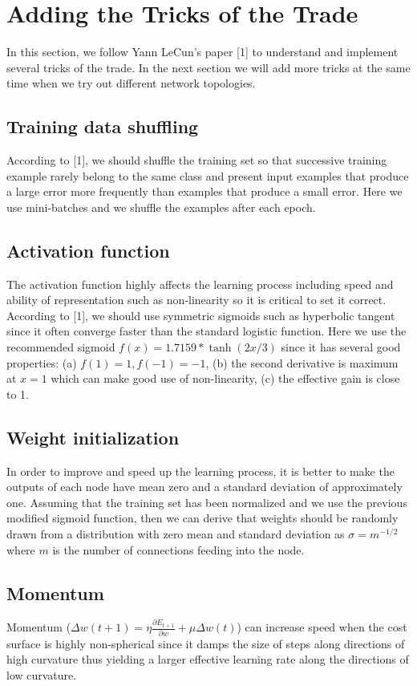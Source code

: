 \documentclass{article} %
\begin{document}
\section{Adding the Tricks of the Trade}
In this section, we follow Yann LeCun's paper [1] to understand and implement several tricks of the trade. In the next section we will add more tricks at the same time when we try out different network topologies. 

\subsection{Training data shuffling}
According to [1], we should shuffle the training set so that successive training example rarely belong to the same class and present input examples that produce a large error more frequently than examples that produce a small error. Here we use mini-batches and we shuffle the examples after each epoch. 

\subsection{Activation function}
The activation function highly affects the learning process including speed and ability of representation such as non-linearity so it is critical to set it correct. According to [1], we should use symmetric sigmoids such as hyperbolic tangent since it often converge faster than the standard logistic function. Here we use the recommended sigmoid $f(x) = 1.7159*\tanh(2x/3)$ since it has several good properties: (a) $f(1) = 1, f(-1) = -1$, (b) the second derivative is maximum at $x = 1$ which can make good use of non-linearity, (c) the effective gain is close to 1. 

\subsection{Weight initialization}
In order to improve and speed up the learning process, it is better to make the outputs of each node have mean zero and a standard deviation of approximately one. Assuming that the training set has been normalized and we use the previous modified sigmoid function, then we can derive that weights should be randomly drawn from a distribution with zero mean and standard deviation as $\sigma = m^{-1/2}$ where $m$ is the number of connections feeding into the node. 

\subsection{Momentum}
Momentum ($\Delta w(t+1) = \eta\frac{\partial E_{t+1}}{\partial w} + \mu \Delta w(t)$) can increase speed when the cost surface is highly non-spherical since it damps the size of steps along directions of high curvature thus yielding a larger effective learning rate along the directions of low curvature. 
\end{document}
